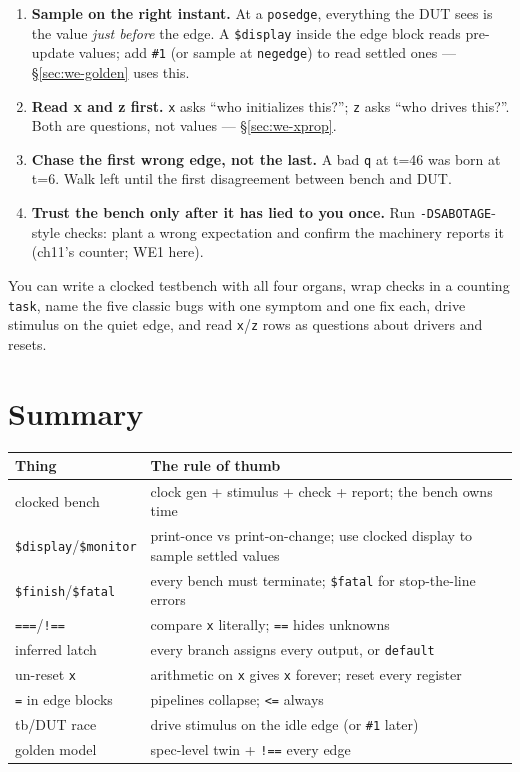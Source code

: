 \begin{enumerate}
\item \textbf{Sample on the right instant.} At a \texttt{posedge},
everything the DUT sees is the value \emph{just before} the edge.
A \texttt{\$display} inside the edge block reads pre-update values;
add \texttt{\#1} (or sample at \texttt{negedge}) to read settled
ones --- \S\ref{sec:we-golden} uses this.
\item \textbf{Read x and z first.} \texttt{x} asks ``who initializes
this?''; \texttt{z} asks ``who drives this?''. Both are questions,
not values --- \S\ref{sec:we-xprop}.
\item \textbf{Chase the first wrong edge, not the last.} A bad
\texttt{q} at t=46 was born at t=6. Walk left until the first
disagreement between bench and DUT.
\item \textbf{Trust the bench only after it has lied to you once.}
Run \texttt{-DSABOTAGE}-style checks: plant a wrong expectation and
confirm the machinery reports it (ch11's counter; WE1 here).
\end{enumerate}

\begin{checkpoint}
You can write a clocked testbench with all four organs, wrap checks
in a counting \texttt{task}, name the five classic bugs with one
symptom and one fix each, drive stimulus on the quiet edge, and read
\texttt{x}/\texttt{z} rows as questions about drivers and resets.
\end{checkpoint}

\section{Summary}\label{sec:sum12}

\begin{center}
\begin{tabularx}{\linewidth}{@{}lX@{}}
\toprule
\textbf{Thing} & \textbf{The rule of thumb}\\
\midrule
clocked bench & clock gen + stimulus + check + report; the bench owns time\\
\texttt{\$display}/\texttt{\$monitor} & print-once vs print-on-change; use clocked display to sample settled values\\
\texttt{\$finish}/\texttt{\$fatal} & every bench must terminate; \texttt{\$fatal} for stop-the-line errors\\
\texttt{===}/\texttt{!==} & compare \texttt{x} literally; \texttt{==} hides unknowns\\
inferred latch & every branch assigns every output, or \texttt{default}\\
un-reset \texttt{x} & arithmetic on \texttt{x} gives \texttt{x} forever; reset every register\\
\texttt{=} in edge blocks & pipelines collapse; \texttt{<=} always\\
tb/DUT race & drive stimulus on the idle edge (or \texttt{\#1} later)\\
golden model & spec-level twin + \texttt{!==} every edge\\
\bottomrule
\end{tabularx}
\end{center}

